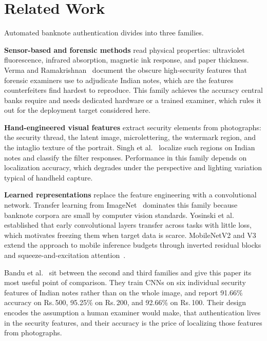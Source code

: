 \documentclass[conference]{IEEEtran}
\newcommand{\rupee}{Rs.\,}
\begin{document}
\section{Related Work}

Automated banknote authentication divides into three families.

\textbf{Sensor-based and forensic methods} read physical properties:
ultraviolet fluorescence, infrared absorption, magnetic ink response, and paper
thickness. Verma and Ramakrishnan~\cite{verma2019forensic} document the obscure
high-security features that forensic examiners use to adjudicate Indian notes,
which are the features counterfeiters find hardest to reproduce. This family
achieves the accuracy central banks require and needs dedicated hardware or a
trained examiner, which rules it out for the deployment target considered here.

\textbf{Hand-engineered visual features} extract security elements from
photographs: the security thread, the latent image, microlettering, the
watermark region, and the intaglio texture of the portrait. Singh et
al.~\cite{singh2018image} localize such regions on Indian notes and classify the
filter responses. Performance in this family depends on localization accuracy,
which degrades under the perspective and lighting variation typical of handheld
capture.

\textbf{Learned representations} replace the feature engineering with a
convolutional network. Transfer learning from ImageNet~\cite{deng2009imagenet}
dominates this family because banknote corpora are small by computer vision
standards. Yosinski et al.~\cite{yosinski2014transferable} established that
early convolutional layers transfer across tasks with little loss, which
motivates freezing them when target data is scarce. MobileNetV2 and
V3~\cite{sandler2018mobilenetv2,howard2019mobilenetv3} extend the approach to
mobile inference budgets through inverted residual blocks and
squeeze-and-excitation attention~\cite{hu2018squeeze}.

Bandu et al.~\cite{bandu2024indian} sit between the second and third families
and give this paper its most useful point of comparison. They train CNNs on six
individual security features of Indian notes rather than on the whole image, and
report 91.66\% accuracy on \rupee500, 95.25\% on \rupee200, and 92.66\% on
\rupee100. Their design encodes the assumption a human examiner would make, that
authentication lives in the security features, and their accuracy is the price
of localizing those features from photographs.
\end{document}
